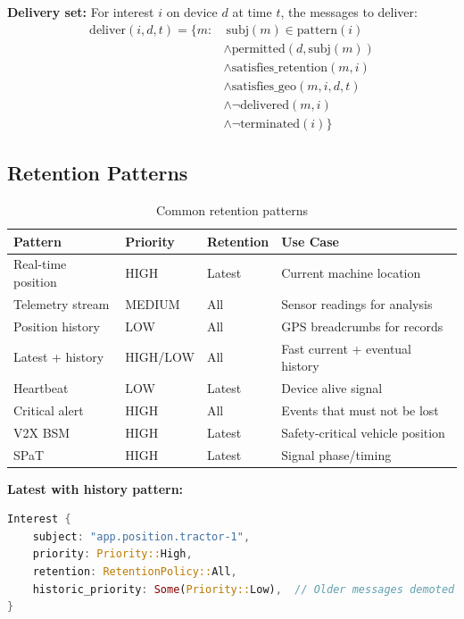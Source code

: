 \textbf{Delivery set:} For interest $i$ on device $d$ at time $t$, the messages to deliver:
\begin{align*}
\text{deliver}(i, d, t) = \{m : &\ \text{subj}(m) \in \text{pattern}(i) \\
&\land \text{permitted}(d, \text{subj}(m)) \\
&\land \text{satisfies\_retention}(m, i) \\
&\land \text{satisfies\_geo}(m, i, d, t) \\
&\land \lnot\text{delivered}(m, i) \\
&\land \lnot\text{terminated}(i)\}
\end{align*}

\subsection{Retention Patterns}

\begin{table}[H]
\centering
\begin{tabular}{@{}llll@{}}
\toprule
\textbf{Pattern} & \textbf{Priority} & \textbf{Retention} & \textbf{Use Case} \\
\midrule
Real-time position & HIGH & Latest & Current machine location \\
Telemetry stream & MEDIUM & All & Sensor readings for analysis \\
Position history & LOW & All & GPS breadcrumbs for records \\
Latest + history & HIGH/LOW & All & Fast current + eventual history \\
Heartbeat & LOW & Latest & Device alive signal \\
Critical alert & HIGH & All & Events that must not be lost \\
V2X BSM & HIGH & Latest & Safety-critical vehicle position \\
SPaT & HIGH & Latest & Signal phase/timing \\
\bottomrule
\end{tabular}
\caption{Common retention patterns}
\end{table}

\textbf{Latest with history pattern:}

\begin{lstlisting}[language=Rust]
Interest {
    subject: "app.position.tractor-1",
    priority: Priority::High,
    retention: RetentionPolicy::All,
    historic_priority: Some(Priority::Low),  // Older messages demoted
}
\end{lstlisting}


